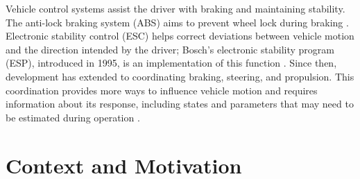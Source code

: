 \documentclass[12pt,a4paper]{report}
\begin{document}
Vehicle control systems assist the driver with braking and maintaining stability. The anti-lock braking system (ABS) aims to prevent wheel lock during braking \cite{BoschNDSafe}. Electronic stability control (ESC) helps correct deviations between vehicle motion and the direction intended by the driver; Bosch's electronic stability program (ESP), introduced in 1995, is an implementation of this function \cite{Bosch2025ESP}. Since then, development has extended to coordinating braking, steering, and propulsion. This coordination provides more ways to influence vehicle motion and requires information about its response, including states and parameters that may need to be estimated during operation \cite{Skrickij2024Review}.



\section{Context and Motivation}

\end{document}
